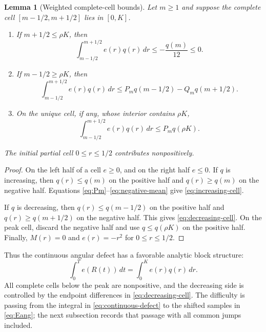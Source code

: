 \documentclass[11pt]{article}
\newtheorem{lemma}{Lemma}
\theoremstyle{remark}
\begin{document}
\begin{lemma}[Weighted complete-cell bounds]
\label{lem:weighted-cells}
Let $m\geq1$ and suppose the complete cell
$[m-1/2,m+1/2]$ lies in $[0,K]$.
\begin{enumerate}
\item If $m+1/2\leq\rho K$, then
\begin{equation}
 \int_{m-1/2}^{m+1/2}e(r)q(r)\,dr
 \leq-\frac{q(m)}{12}\leq0.
 \label{eq:increasing-cell}
\end{equation}
\item If $m-1/2\geq\rho K$, then
\begin{equation}
 \int_{m-1/2}^{m+1/2}e(r)q(r)\,dr
 \leq P_mq(m-1/2)-Q_mq(m+1/2).
 \label{eq:decreasing-cell}
\end{equation}
\item On the unique cell, if any, whose interior contains $\rho K$,
\begin{equation}
 \int_{m-1/2}^{m+1/2}e(r)q(r)\,dr
 \leq P_m q(\rho K).
 \label{eq:peak-cell}
\end{equation}
\end{enumerate}
The initial partial cell $0\leq r\leq1/2$ contributes nonpositively.
\end{lemma}

\begin{proof}
On the left half of a cell $e\geq0$, and on the right half $e\leq0$.
If $q$ is increasing, then $q(r)\leq q(m)$ on the positive half and
$q(r)\geq q(m)$ on the negative half.  Equations
\eqref{eq:Pm}--\eqref{eq:negative-mean} give
\eqref{eq:increasing-cell}.

If $q$ is decreasing, then $q(r)\leq q(m-1/2)$ on the positive half and
$q(r)\geq q(m+1/2)$ on the negative half.  This gives
\eqref{eq:decreasing-cell}.  On the peak cell, discard the negative half
and use $q\leq q(\rho K)$ on the positive half.  Finally, $M(r)=0$ and
$e(r)=-r^2$ for $0\leq r\leq1/2$.
\end{proof}

Thus the continuous angular defect has a favorable analytic block
structure:
\begin{equation}
 \int_0^T e(R(t))\,dt=\int_0^K e(r)q(r)\,dr.
 \label{eq:continuous-defect}
\end{equation}
All complete cells below the peak are nonpositive, and the decreasing
side is controlled by the endpoint differences in
\eqref{eq:decreasing-cell}.  The difficulty is passing from the integral
in \eqref{eq:continuous-defect} to the shifted samples in
\eqref{eq:Eang}; the next subsection records that passage with all common
jumps included.
\end{document}
